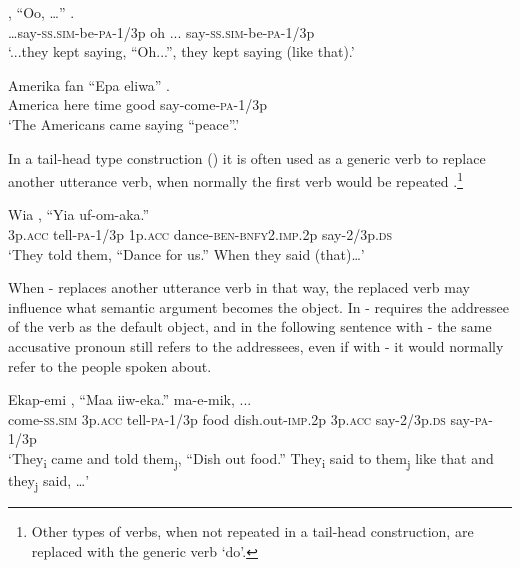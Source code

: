\ea%
\label{ex:3:x323}
\gll {\dots}, ``Oo, {\dots}'' . \\
{\dots}say-\textsc{ss}.\textsc{sim}-be-\textsc{pa}-1/3p oh ... say-\textsc{ss}.\textsc{sim}-be-\textsc{pa}-1/3p \\
\glt`...they kept saying, ``Oh...'', they kept saying (like that).'
\z

\ea%
\label{ex:3:x942}
\gll Amerika fan ``Epa eliwa'' . \\
America here time good say-come-\textsc{pa}-1/3p\\
\glt`The Americans came saying ``peace''.'
\z

In a tail-head type construction () it is often used as a generic verb to replace another utterance verb, when normally the first verb would be repeated .\footnote{Other types of verbs, when not repeated in a tail-head construction, are replaced with the generic verb  `do'.} 

\ea%
\label{ex:3:x324}
\gll Wia , ``Yia uf-om-aka.'' \\
3p.\textsc{acc} tell-\textsc{pa}-1/3p 1p.\textsc{acc} dance-\textsc{ben}-\textsc{bnfy}2.\textsc{imp}.2p say-2/3p.\textsc{ds}\\
\glt`They told them, ``Dance for us.'' When they said (that){\dots}'
\z

When - replaces another utterance verb in that way, the replaced verb may influence what semantic argument becomes the object. In  - requires the addressee of the verb as the default object, and in the following sentence with - the same accusative pronoun \textit{ }still refers to the addressees, even if with - it would normally refer to the people spoken about.

\ea%
\label{ex:3:x325}
\gll Ekap-emi  , ``Maa iiw-eka.''   ma-e-mik, ...\\
come-\textsc{ss}.\textsc{sim} 3p.\textsc{acc} tell-\textsc{pa}-1/3p food dish.out-\textsc{imp}.2p 3p.\textsc{acc} say-2/3p.\textsc{ds} say-\textsc{pa}-1/3p\\
\glt`They\textsubscript{i} came and told them\textsubscript{j}, ``Dish out food.'' They\textsubscript{i} said to them\textsubscript{j} like that and they\textsubscript{j} said, {\dots}'
\z

